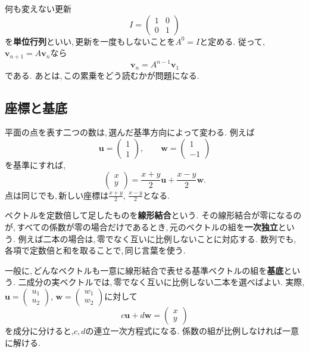 何も変えない更新
\[
 I=\begin{pmatrix}1&0\\0&1\end{pmatrix}
\]
を\textbf{単位行列}といい,\,更新を一度もしないことを$A^0=I$と定める.
従って,$\boldsymbol v_{n+1}=A\boldsymbol v_n$なら
\[
 \boldsymbol v_n=A^{n-1}\boldsymbol v_1
\]
である. あとは,\,この累乗をどう読むかが問題になる.

\subsection{座標と基底}\label{節：座標と基底}

平面の点を表す二つの数は,\,選んだ基準方向によって変わる.
例えば
\[
 \boldsymbol u=\begin{pmatrix}1\\1\end{pmatrix},
 \qquad
 \boldsymbol w=\begin{pmatrix}1\\-1\end{pmatrix}
\]
を基準にすれば,
\[
 \begin{pmatrix}x\\y\end{pmatrix}
 =\frac{x+y}{2}\boldsymbol u
  +\frac{x-y}{2}\boldsymbol w.
\]
点は同じでも,\,新しい座標は$\frac{x+y}{2},\,\frac{x-y}{2}$となる.
\NewFigBasis

ベクトルを定数倍して足したものを\textbf{線形結合}という.
その線形結合が零になるのが,\,すべての係数が零の場合だけであるとき,\,元のベクトルの組を\textbf{一次独立}という.
例えば二本の場合は,\,零でなく互いに比例しないことに対応する.
数列でも,\,各項で定数倍と和を取ることで,\,同じ言葉を使う.

一般に,\,どんなベクトルも一意に線形結合で表せる基準ベクトルの組を\textbf{基底}という.
二成分の実ベクトルでは,\,零でなく互いに比例しない二本を選べばよい.
実際,$\boldsymbol u=\begin{pmatrix}u_1\\u_2\end{pmatrix}$,
$\boldsymbol w=\begin{pmatrix}w_1\\w_2\end{pmatrix}$に対して
\[
 c\boldsymbol u+d\boldsymbol w
 =\begin{pmatrix}x\\y\end{pmatrix}
\]
を成分に分けると,$c,d$の連立一次方程式になる.
係数の組が比例しなければ一意に解ける.

